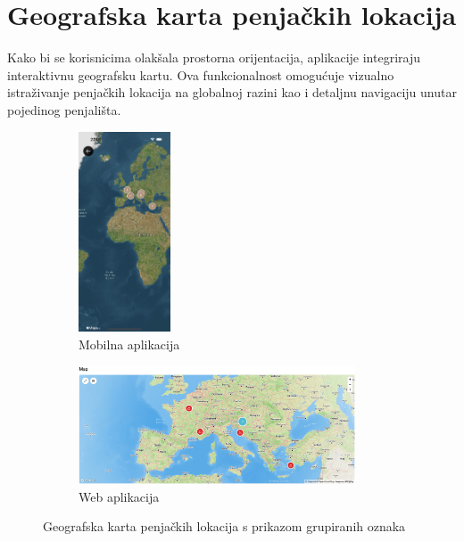 \section{Geografska karta penjačkih lokacija}

Kako bi se korisnicima olakšala prostorna orijentacija, aplikacije integriraju interaktivnu geografsku kartu. Ova funkcionalnost omogućuje vizualno istraživanje penjačkih lokacija na globalnoj razini kao i detaljnu navigaciju unutar pojedinog penjališta.

\begin{figure}[H]
    \centering
    \begin{subfigure}[b]{\textwidth}
        \centering
        \includegraphics[width=0.3\textwidth]{images/implementacija/geo_karta.png}
        \caption{Mobilna aplikacija}
        \label{fig:geografska_karta_mob}
    \end{subfigure}
    \hfill
    \begin{subfigure}[b]{\textwidth}
        \centering
        \includegraphics[width=0.9\textwidth]{images/implementacija/web/map_clusters.jpeg}
        \caption{Web aplikacija}
        \label{fig:geografska_karta_web}
    \end{subfigure}
    \caption{Geografska karta penjačkih lokacija s prikazom grupiranih oznaka}
    \label{fig:geografska_karta_sidebyside}
\end{figure}

